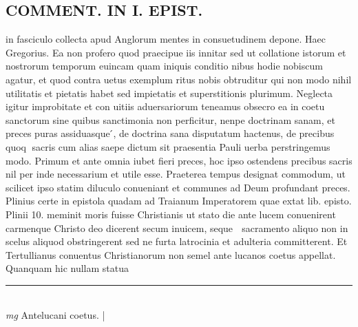 \documentclass{article}
\begin{document}
\begin{pages}
\section*{COMMENT. IN I. EPIST. }\pstart in fasciculo collecta apud Anglorum mentes in consuetudinem depone. Haec Gregorius. Ea non profero quod praecipue iis innitar sed ut collatione istorum et nostrorum temporum euincam quam iniquis conditio nibus hodie nobiscum agatur, et quod contra uetus exemplum ritus nobis obtruditur qui non modo nihil utilitatis et pietatis habet sed impietatis et superstitionis plurimum. Neglecta igitur improbitate et con uitiis aduersariorum teneamus obsecro ea in coetu sanctorum sine quibus sanctimonia non perficitur, nenpe doctrinam sanam, et preces puras assiduasque ́, de doctrina sana disputatum hactenus, de precibus quoq sacris cum alias saepe dictum sit praesentia Pauli uerba perstringemus modo. Primum et ante omnia iubet fieri preces, hoc ipso ostendens precibus sacris nil per inde necessarium et utile esse. Praeterea tempus designat commodum, ut scilicet ipso statim diluculo conueniant et communes ad Deum profundant preces. Plinius certe in epistola quadam ad Traianum Imperatorem quae extat lib. episto. Plinii 10. meminit moris fuisse Christianis ut stato die ante lucem conuenirent carmenque Christo deo dicerent secum inuicem, seque  sacramento aliquo non in scelus aliquod obstringerent sed ne furta latrocinia et adulteria committerent. Et Tertullianus conuentus Christianorum non semel ante lucanos coetus appellat. Quanquam hic nullam statua\pend
\vspace{0.5cm}\noindent
\vspace{0.2cm}\rule{1cm}{0.2pt}\\ 
\hspace{0.2cm}\textit{mg}
\footnotesize Antelucani coetus. 
\normalsize| 

\end{pages}
\end{document}
